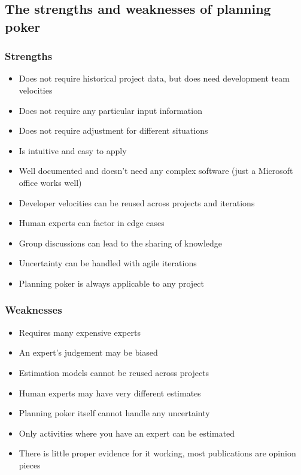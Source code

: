 \subsection{The strengths and weaknesses of planning poker}\label{sub:the_strengths_and_weaknesses_of_planning_poker}

\subsubsection{Strengths}\label{ssub:strengths}

\begin{itemize}
    \item Does not require historical project data, but does need development team velocities
    \item Does not require any particular input information
    \item Does not require adjustment for different situations
    \item Is intuitive and easy to apply
    \item Well documented and doesn't need any complex software (just a Microsoft office works well)
    \item Developer velocities can be reused across projects and iterations
    \item Human experts can factor in edge cases
    \item Group discussions can lead to the sharing of knowledge
    \item Uncertainty can be handled with agile iterations
    \item Planning poker is always applicable to any project
\end{itemize}

\subsubsection{Weaknesses}\label{ssub:weaknesses}

\begin{itemize}
    \item Requires many expensive experts
    \item An expert's judgement may be biased
    \item Estimation models cannot be reused across projects
    \item Human experts may have very different estimates
    \item Planning poker itself cannot handle any uncertainty
    \item Only activities where you have an expert can be estimated
    \item There is little proper evidence for it working, most publications are opinion pieces
\end{itemize}

